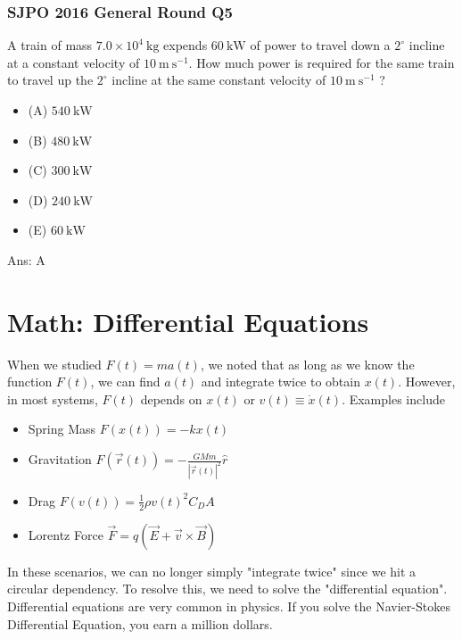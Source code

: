 \documentclass{article}
\begin{document}
\subsubsection{SJPO 2016 General Round Q5}
A train of mass $7.0 \times 10^4 \mathrm{~kg}$ expends $60 \mathrm{~kW}$ of power to travel down a $2^{\circ}$ incline at a constant velocity of $10 \mathrm{~m} \mathrm{~s}^{-1}$. How much power is required for the same train to travel up the $2^{\circ}$ incline at the same constant velocity of $10 \mathrm{~m} \mathrm{~s}^{-1}$ ?
\begin{itemize}
\item[] (A) $540 \mathrm{~kW}$
\item[] (B) $480 \mathrm{~kW}$
\item[] (C) $300 \mathrm{~kW}$
\item[] (D) $240 \mathrm{~kW}$
\item[] (E) $60 \mathrm{~kW}$
\end{itemize}
Ans:  \ifpaper A \fi
\section{Math: Differential Equations}
When we studied $F(t)=ma(t)$, we noted that as long as we know the function $F(t)$, we can find $a(t)$ and integrate twice to obtain $x(t)$. However, in most systems, $F(t)$ depends on $x(t)$ or $v(t) \equiv \dot{x}(t)$. Examples include 
\begin{itemize}
    \item Spring Mass $F(x(t)) = -kx(t)$
    \item Gravitation $F(\vec{r}(t)) = -\frac{GMm}{|\vec{r}(t)|^2} \hat{r}$
    \item Drag $F(v(t)) = \frac{1}{2} \rho v(t)^2 C_D A$
    \item Lorentz Force $\vec{F} = q(\vec{E} + \vec{v} \times \vec{B})$
\end{itemize}
In these scenarios, we can no longer simply "integrate twice" since we hit a circular dependency. To resolve this, we need to solve the "differential equation". Differential equations are very common in physics. If you solve the Navier-Stokes Differential Equation, you earn a million dollars.
\end{document}
